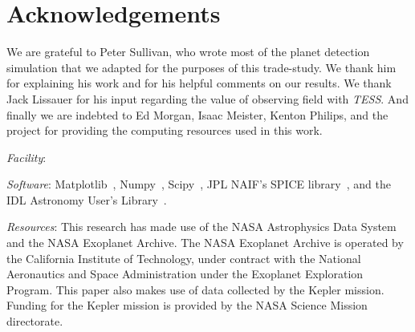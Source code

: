 \section*{Acknowledgements}
We are grateful to Peter Sullivan, who wrote most of the planet detection simulation that we adapted for the purposes of this trade-study.
We thank him for explaining his work and for his helpful comments on our results.
We thank Jack Lissauer for his input regarding the value of observing \keplers field with \textit{TESS}.
And finally we are indebted to Ed Morgan, Isaac Meister, Kenton Philips, and the \tess project for providing the computing resources used in this work.

\vspace{0.5cm}
\textit{Facility}: \tess

\textit{Software}: Matplotlib~\citep{hunter_matplotlib_2007}, Numpy~\citep{walt_numpy_2011}, Scipy~\citep{jones_scipy_2001}, JPL NAIF's SPICE library~\citep{acton_SPICE_1996}, and the IDL Astronomy User's Library~\citep{landsman_idl_1995}.

\textit{Resources}: This research has made use of the NASA Astrophysics Data System and the NASA Exoplanet Archive. The NASA Exoplanet Archive is operated by the California Institute of Technology, under contract with the National Aeronautics and Space Administration under the Exoplanet Exploration Program.
This paper also makes use of data collected by the Kepler mission. Funding for the Kepler mission is provided by the NASA Science Mission directorate.
